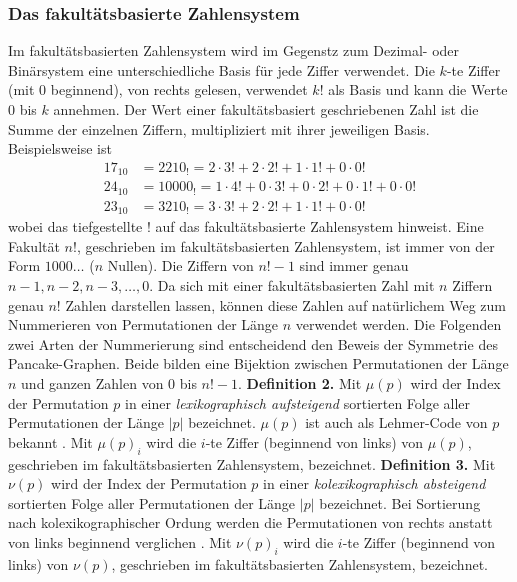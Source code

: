 \documentclass[a4paper, 11pt, ngerman]{article}
\begin{document}
\subsubsection*{Das fakultätsbasierte Zahlensystem}
Im fakultätsbasierten Zahlensystem wird im Gegenstz zum Dezimal- oder Binärsystem eine unterschiedliche Basis für jede Ziffer verwendet. Die $k$-te Ziffer (mit 0 beginnend), von rechts gelesen, verwendet $k!$ als Basis und kann die Werte 0 bis $k$ annehmen. Der Wert einer fakultätsbasiert geschriebenen Zahl ist die Summe der einzelnen Ziffern, multipliziert mit ihrer jeweiligen Basis. Beispielsweise ist
\begin{align*}
    17_{10} & = 2210_!   = 2 \cdot 3! + 2 \cdot 2! + 1 \cdot 1! + 0 \cdot 0!             \\
    24_{10} & = 10000_! = 1 \cdot 4! + 0 \cdot 3! + 0 \cdot 2! + 0 \cdot 1! + 0 \cdot 0! \\
    23_{10} & = 3210_!  = 3 \cdot 3! + 2 \cdot 2! + 1 \cdot 1! + 0 \cdot 0!
\end{align*}
wobei das tiefgestellte ! auf das fakultätsbasierte Zahlensystem hinweist. Eine Fakultät $n!$, geschrieben im fakultätsbasierten Zahlensystem, ist immer von der Form $1000\dots$ ($n$ Nullen). Die Ziffern von $n! - 1$ sind immer genau $n-1, n-2, n-3, \dots, 0$.
Da sich mit einer fakultätsbasierten Zahl mit $n$ Ziffern genau $n!$ Zahlen darstellen lassen, können diese Zahlen auf natürlichem Weg zum Nummerieren von Permutationen der Länge $n$ verwendet werden. Die Folgenden zwei Arten der Nummerierung sind entscheidend den Beweis der Symmetrie des Pancake-Graphen. Beide bilden eine Bijektion zwischen Permutationen der Länge $n$ und ganzen Zahlen von 0 bis $n! - 1$.
\newline \newline
\textbf{Definition 2.} Mit $\mu(p)$ wird der Index der Permutation $p$ in einer \emph{lexikographisch aufsteigend} sortierten Folge aller Permutationen der Länge $|p|$ bezeichnet. $\mu(p)$ ist auch als Lehmer-Code von $p$ bekannt \cite{factorial}. Mit $\mu(p)_i$ wird die $i$-te Ziffer (beginnend von links) von $\mu(p)$, geschrieben im fakultätsbasierten Zahlensystem, bezeichnet.
\newline \newline
\textbf{Definition 3.} Mit $\nu(p)$ wird der Index der Permutation $p$ in einer \emph{kolexikographisch absteigend} sortierten Folge aller Permutationen der Länge $|p|$ bezeichnet. Bei Sortierung nach kolexikographischer Ordung werden die Permutationen von rechts anstatt von links beginnend verglichen \cite{lexicographic}. Mit $\nu(p)_i$ wird die $i$-te Ziffer (beginnend von links) von $\nu(p)$, geschrieben im fakultätsbasierten Zahlensystem, bezeichnet.
\end{document}
